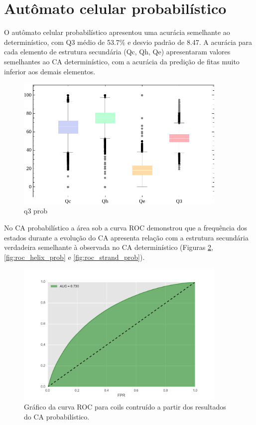 

\section{Autômato celular probabilístico}

O autômato celular probabilístico apresentou uma acurácia semelhante ao determinístico, com Q3 médio de 53.7\% e desvio padrão de 8.47. A acurácia para cada elemento de estrutura secundária (Qc, Qh, Qe)  apresentaram valores semelhantes ao CA determinístico, com a acurácia da predição de fitas muito inferior aos demais elementos. 


\begin{figure}
	\centering
	\includegraphics[width=0.9\textwidth]{figures/q3_prob.pdf}
	\caption{q3 prob}
	\label{fig:q3_prob}
\end{figure}


No CA probabilístico a área sob a curva ROC demonstrou que a frequência dos estados durante a evolução do CA apresenta relação com a estrutura secundária verdadeira semelhante à observada no CA determinístico (Figuras \ref{fig:roc_coil_prob}, \ref{fig:roc_helix_prob} e \ref{fig:roc_strand_prob}).  

\begin{figure}
	\centering
	\includegraphics[width=0.9\textwidth]{figures/figure_roc_coil_prob.pdf}
	\caption{Gráfico da curva ROC para coils contruído a partir dos resultados do CA probabilístico.}
	\label{fig:roc_coil_prob}
\end{figure}

